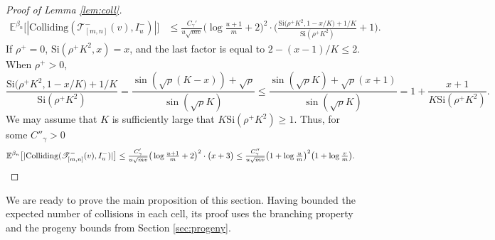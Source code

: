 \documentclass[a4paper, a4wide, 10pt, reqno]{amsart}
\theoremstyle{plain}
\theoremstyle{definition}
\numberwithin{equation}{section}
\newcommand{\E}{\mathbb E}
\newcommand{\sT}{{\mathscr T}}
\newcommand{\Si}{{\mathrm{Si}}}
\begin{document}
\begin{proof}[Proof of Lemma \ref{lem:coll}]
\[
    \begin{aligned}
        \E^{\beta_n}\big[|\mathrm{Colliding}(\sT_{[m,n]}^-(v), I_u^-)|\big] 
        &\le \frac{C_\gamma'}{u\sqrt{mv}}\bigg(\log\frac{u+1}{m} + 2\bigg)^2\cdot \bigg(\frac{\Si\big(\rho^+ K^2, 1-x/K\big)+1/K}{\Si(\rho^+ K^2)}+1\bigg).
    \end{aligned}
    \]
    If $\rho^+=0$, $\Si(\rho^+ K^2, x)=x$, and the last factor is equal to $2-(x-1)/K\le 2$. When $\rho^+>0$, 
    \[
    \frac{\Si\big(\rho^+ K^2, 1-x/K\big)+1/K}{\Si(\rho^+ K^2)} = \frac{\sin(\sqrt{\rho}(K-x))+\sqrt{\rho}}{\sin(\sqrt{\rho}K)} \le \frac{\sin(\sqrt{\rho}K) + \sqrt{\rho}(x+1)}{\sin(\sqrt{\rho}K)} = 1+ \frac{x+1}{K\Si(\rho^+K^2)}.
    \]
    We may assume that $K$ is sufficiently large that $K\Si(\rho^+K^2)\ge 1$. Thus, for some $C''_\gamma>0$ 
    \begin{align*}
    \E^{\beta_n}\big[|\mathrm{Colliding}(\sT_{[m,n]}^-(v), I_u^-)|\big]
        &\le \tfrac{C_\gamma'}{u\sqrt{mv}}\big(\log\tfrac{u+1}{m} + 2\big)^2\cdot \big(x+3\big)\le \tfrac{C''_\gamma}{u\sqrt{mv}}\big(1+\log\tfrac{u}{m} \big)^2\big(1+\log\tfrac{v}{m}\big).\qedhere
        \end{align*}
\end{proof}
We are ready to prove the main proposition of this section. Having bounded the expected number of collisions in each cell, its proof uses the branching property and the progeny bounds from Section \ref{sec:progeny}.
\end{document}
